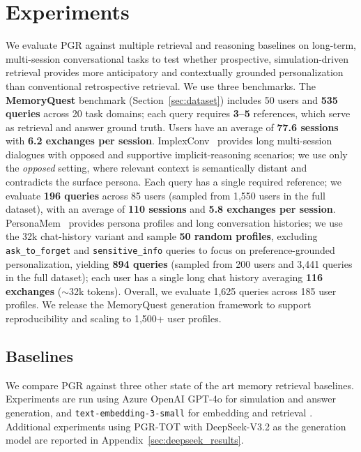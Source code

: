 
\section{Experiments}
\label{sec:evaluation}

We evaluate PGR against multiple retrieval and reasoning baselines on long-term, multi-session conversational tasks to test whether prospective, simulation-driven retrieval provides more anticipatory and contextually grounded personalization than conventional retrospective retrieval. We use three benchmarks. The \textbf{MemoryQuest} benchmark (Section~\ref{sec:dataset}) includes 50 users and \textbf{535 queries} across 20 task domains; each query requires \textbf{3--5} references, which serve as retrieval and answer ground truth. Users have an average of \textbf{77.6 sessions} with \textbf{6.2 exchanges per session}. {ImplexConv}~\cite{li2025implexconv} provides long multi-session dialogues with opposed and supportive implicit-reasoning scenarios; we use only the \textit{opposed} setting, where relevant context is semantically distant and contradicts the surface persona. Each query has a single required reference; we evaluate \textbf{196 queries} across 85 users (sampled from 1,550 users in the full dataset), with an average of \textbf{110 sessions} and \textbf{5.8 exchanges per session}. {PersonaMem}~\cite{jiang2025personamem} provides persona profiles and long conversation histories; we use the 32k chat-history variant and sample \textbf{50 random profiles}, excluding \texttt{ask\_to\_forget} and \texttt{sensitive\_info} queries to focus on preference-grounded personalization, yielding \textbf{894 queries} (sampled from 200 users and 3,441 queries in the full dataset); each user has a single long chat history averaging \textbf{116 exchanges} ($\sim$32k tokens). Overall, we evaluate 1,625 queries across 185 user profiles. We release the MemoryQuest generation framework to support reproducibility and scaling to 1,500+ user profiles.


\subsection{Baselines}
We compare PGR against three other state of the art memory retrieval baselines. Experiments are run using Azure OpenAI GPT-4o for simulation and answer generation, and \texttt{text-embedding-3-small} for embedding and retrieval \cite{openai2024embeddings}. Additional experiments using PGR-TOT with DeepSeek-V3.2 as the generation model are reported in Appendix~\ref{sec:deepseek_results}.

